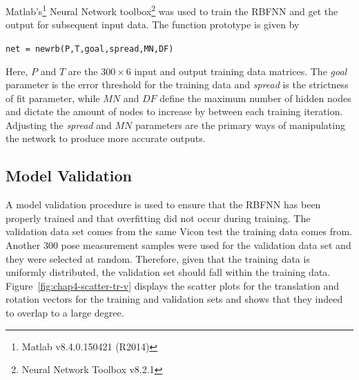 Matlab's\footnote{Matlab v8.4.0.150421 (R2014)} Neural Network toolbox\footnote{Neural Network Toolbox v8.2.1} was used to train the RBFNN and get the output for subsequent input data. The function prototype is given by 

\begin{center}
  \verb|net = newrb(P,T,goal,spread,MN,DF)|
\end{center}

Here, $P$ and $T$ are the $300\times6$ input and output training data matrices. The \emph{goal} parameter is the error threshold for the training data and \emph{spread} is the strictness of fit parameter, while $\mathit{MN}$ and $\mathit{DF}$ define the maximum number of hidden nodes and dictate the amount of nodes to increase by between each training iteration. Adjusting the \emph{spread} and $\mathit{MN}$ parameters are the primary ways of manipulating the network to produce more accurate outputs. 

\subsection{Model Validation}

A model validation procedure is used to ensure that the RBFNN has been properly trained and that overfitting did not occur during training. The validation data set comes from the same Vicon test the training data comes from. Another 300 pose measurement samples were used for the validation data set and they were selected at random. Therefore, given that the training data is uniformly distributed, the validation set should fall within the training data. Figure~\ref{fig:chap4-scatter-tr-v} displays the scatter plots for the translation and rotation vectors for the training and validation sets and shows that they indeed to overlap to a large degree. 

